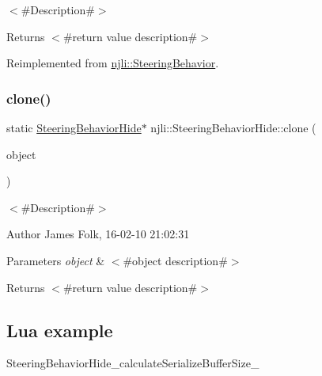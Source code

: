 $<$\#\+Description\#$>$

\begin{DoxyReturn}{Returns}
$<$\#return value description\#$>$ 
\end{DoxyReturn}


Reimplemented from \mbox{\hyperlink{classnjli_1_1_steering_behavior_abbc461d853c1b225cfde5b79d96d11bd}{njli\+::\+Steering\+Behavior}}.

\mbox{\label{classnjli_1_1_steering_behavior_hide_a4ba08fb5769667a6fa43d5ba3688ddd9}} 
\subsubsection{\texorpdfstring{clone()}{clone()}}
{\footnotesize\ttfamily static \mbox{\hyperlink{classnjli_1_1_steering_behavior_hide}{Steering\+Behavior\+Hide}}$\ast$ njli\+::\+Steering\+Behavior\+Hide\+::clone (\begin{DoxyParamCaption}\item[{const \mbox{\hyperlink{classnjli_1_1_steering_behavior_hide}{Steering\+Behavior\+Hide}} \&}]{object }\end{DoxyParamCaption})\hspace{0.3cm}{\ttfamily [static]}}



$<$\#\+Description\#$>$ 

\begin{DoxyAuthor}{Author}
James Folk, 16-\/02-\/10 21\+:02\+:31
\end{DoxyAuthor}

\begin{DoxyParams}{Parameters}
{\em object} & $<$\#object description\#$>$\\
\hline
\end{DoxyParams}
\begin{DoxyReturn}{Returns}
$<$\#return value description\#$>$
\end{DoxyReturn}
\hypertarget{classnjli_1_1_steering_behavior_wander_ex1}{}\subsection{Lua example}\label{classnjli_1_1_steering_behavior_wander_ex1}

\begin{DoxyCodeInclude}
\end{DoxyCodeInclude}
Steering\+Behavior\+Hide\+\_\+calculate\+Serialize\+Buffer\+Size\+\_\+ \mbox{\label{classnjli_1_1_steering_behavior_hide_a89d2803a9d246b04c9de95b7ce9d022f}} 
